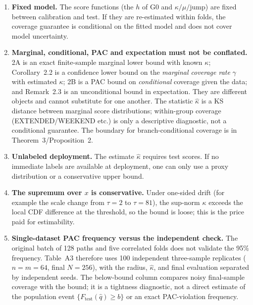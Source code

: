 \begin{enumerate}
  two samples to be independent). The strict version uses the fold's own
  calibration set ($n_{\mathrm{cal}}$ scores at $\tau=2$) and the fold's own
  $m=24$--$28$ scores at $\tau=81$; overlap of $\hat\kappa$ with the evaluated
  test fold does \emph{not} affect the validity of \eqref{eq:a3-2.2} or
  \eqref{eq:a3-2.6} (both $F_{\mathrm{test}}(\hat q)$ and $\gamma$ are population
  quantities); non-overlap is required only for the PAC-frequency validation in
  item~7. Table~\ref{tab:a3-strict} lists the five folds. The 2B values are
  $0.345$--$0.354$ with the pooled $\hat\kappa$ and $m=128$, $0.170$--$0.184$ with
  the fold's $m$ but the pooled $\hat\kappa$ (the old ``strict'' row), and
  $0.000$--$0.165$ with the strict per-fold $\hat\kappa$; only the last is the
  strict row, and fold~3 (zero-based) is empty.
\item \textbf{Fixed model.} The score functions (the $h$ of G0 and
  $\kappa/\mu/\text{jump}$) are fixed between calibration and test. If they are
  re-estimated within folds, the coverage guarantee is conditional on the fitted
  model and does not cover model uncertainty.
\item \textbf{Marginal, conditional, PAC and expectation must not be conflated.}
  2A is an exact finite-sample marginal lower bound with known $\kappa$; Corollary~2.2 is a confidence
  lower bound on the \emph{marginal coverage rate} $\gamma$ with estimated
  $\kappa$; 2B is a PAC bound on \emph{conditional} coverage given the data; and
  Remark~2.3 is an unconditional bound in expectation. They are different objects
  and cannot substitute for one another. The statistic $\hat\kappa$ is a KS
  distance between marginal score distributions; within-group coverage
  (EXTENDED/WEEKEND etc.) is only a descriptive diagnostic, not a conditional
  guarantee. The boundary for branch-conditional coverage is in
  Theorem~3/Proposition~2.
\item \textbf{Unlabeled deployment.} The estimate $\hat\kappa$ requires test
  scores. If no immediate labels are available at deployment, one can only use a
  proxy distribution or a conservative upper bound.
\item \textbf{The supremum over $x$ is conservative.} Under one-sided drift (for
  example the scale change from $\tau=2$ to $\tau=81$), the sup-norm $\kappa$
  exceeds the local CDF difference at the threshold, so the bound is loose; this
  is the price paid for estimability.
\item \textbf{Single-dataset PAC frequency versus the independent check.} The
  original batch of 128 paths and five correlated folds does not validate the
  95\% frequency. Table~A3 therefore uses 100 independent three-sample
  replicates ($n=m=64$, final $N=256$), with the radius, $\hat\kappa$, and
  final evaluation separated by independent seeds. The below-bound column
  compares noisy final-sample coverage with the bound; it is a tightness
  diagnostic, not a direct estimate of the population event
  $\{F_{\mathrm{test}}(\hat q)\ge b\}$ or an exact PAC-violation frequency.
\end{enumerate}

